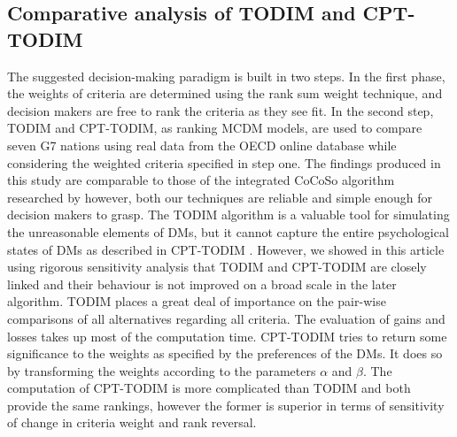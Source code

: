 \documentclass{infor}
\theoremstyle{remark}
\begin{document}
\subsection{Comparative analysis of TODIM and CPT-TODIM}
The suggested decision-making paradigm is built in two steps. In the first phase, the weights of criteria are determined using the rank sum weight technique, and decision makers are free to rank the criteria as they see fit. In the second step, TODIM and CPT-TODIM, as ranking MCDM models, are used to compare seven G7 nations using real data from the OECD online database while considering the weighted criteria specified in step one. The findings produced in this study are comparable to those of the integrated CoCoSo algorithm researched by \cite{torkayesh2021comparative} however, both our techniques are reliable and simple enough for decision makers to grasp. The TODIM algorithm is a valuable tool for simulating the unreasonable elements of DMs, but it cannot capture the entire psychological states of DMs as described in CPT-TODIM \cite{tian2019extended}. However, we showed in this article using rigorous sensitivity analysis that TODIM and CPT-TODIM are closely linked and their behaviour is not improved on a broad scale in the later algorithm. TODIM places a great deal of importance on the pair-wise comparisons of all alternatives regarding all criteria. The evaluation of gains and losses takes up most of the computation time. CPT-TODIM tries to return some significance to the weights as specified by the preferences of the DMs. It does so by transforming the weights according to the parameters \(\alpha\) and \(\beta\). The computation of CPT-TODIM is more complicated than TODIM and both provide the same rankings, however the former is superior in terms of sensitivity of change in criteria weight and rank reversal.
\end{document}
